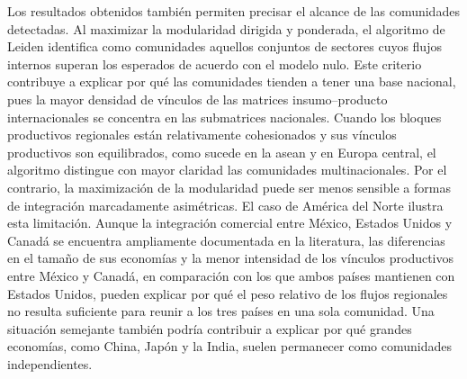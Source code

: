 Los resultados obtenidos también permiten precisar el alcance de las comunidades detectadas. Al maximizar la modularidad dirigida y ponderada, el algoritmo de Leiden identifica como comunidades aquellos conjuntos de sectores cuyos flujos internos superan los esperados de acuerdo con el modelo nulo. Este criterio contribuye a explicar por qué las comunidades tienden a tener una base nacional, pues la mayor densidad de vínculos de las matrices insumo--producto internacionales se concentra en las submatrices nacionales. Cuando los bloques productivos regionales están relativamente cohesionados y sus vínculos productivos son equilibrados, como sucede en la \gls{asean} y en Europa central, el algoritmo distingue con mayor claridad las comunidades multinacionales. Por el contrario, la maximización de la modularidad puede ser menos sensible a formas de integración marcadamente asimétricas. El caso de América del Norte ilustra esta limitación. Aunque la integración comercial entre México, Estados Unidos y Canadá se encuentra ampliamente documentada en la literatura, las diferencias en el tamaño de sus economías y la menor intensidad de los vínculos productivos entre México y Canadá, en comparación con los que ambos países mantienen con Estados Unidos, pueden explicar por qué el peso relativo de los flujos regionales no resulta suficiente para reunir a los tres países en una sola comunidad. Una situación semejante también podría contribuir a explicar por qué grandes economías, como China, Japón y la India, suelen permanecer como comunidades independientes.


